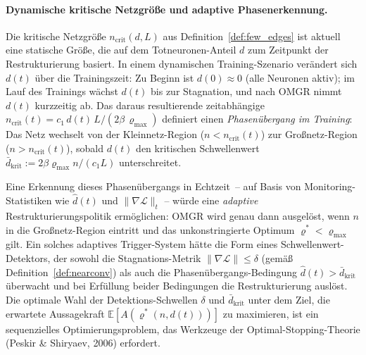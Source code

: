 ﻿\documentclass[12pt, a4paper, openany]{report}
\newcommand{\E}{\mathbb{E}}
\newcommand{\calL}{\mathcal{L}}
\begin{document}
\paragraph{Dynamische kritische Netzgröße und adaptive Phasenerkennung.}
Die kritische Netzgröße $n_{\mathrm{crit}}(d, L)$ aus
Definition~\ref{def:few_edges} ist aktuell eine statische Größe, die auf
dem Totneuronen-Anteil $d$ zum Zeitpunkt der Restrukturierung basiert.  In
einem dynamischen Training-Szenario verändert sich $d(t)$ über die
Trainingszeit: Zu Beginn ist $d(0) \approx 0$ (alle Neuronen aktiv); im Lauf
des Trainings wächst $d(t)$ bis zur Stagnation, und nach OMGR nimmt $d(t)$
kurzzeitig ab.  Das daraus resultierende zeitabhängige
$n_{\mathrm{crit}}(t) = c_1\,d(t)\,L / (2\beta\,\varrho_{\max})$
definiert einen \emph{Phasenübergang im Training}: Das Netz wechselt von
der Kleinnetz-Region ($n < n_{\mathrm{crit}}(t)$) zur Großnetz-Region
($n > n_{\mathrm{crit}}(t)$), sobald $d(t)$ den kritischen Schwellenwert
$\bar{d}_{\mathrm{krit}} := 2\beta\varrho_{\max} n / (c_1 L)$ unterschreitet.

Eine Erkennung dieses Phasenübergangs in Echtzeit~-- auf Basis von
Monitoring-Statistiken wie $\hat{d}(t)$ und $\|\nabla\calL\|_{t}$ -- würde
eine \emph{adaptive} Restrukturierungspolitik ermöglichen: OMGR wird genau
dann ausgelöst, wenn $n$ in die Großnetz-Region eintritt und das
unkonstringierte Optimum $\varrho^* < \varrho_{\max}$ gilt.  Ein solches
adaptives Trigger-System hätte die Form eines Schwellenwert-Detektors, der
sowohl die Stagnations-Metrik $\|\nabla\calL\| \leq \delta$ (gemäß
Definition~\ref{def:nearconv}) als auch die Phasenübergangs-Bedingung
$\hat{d}(t) > \bar{d}_{\mathrm{krit}}$ überwacht und bei Erfüllung beider
Bedingungen die Restrukturierung auslöst.  Die optimale Wahl der
Detektions-Schwellen $\delta$ und $\bar{d}_{\mathrm{krit}}$ unter dem
Ziel, die erwartete Aussagekraft $\E[A(\varrho^*(n, d(t)))]$ zu maximieren,
ist ein sequenzielles Optimierungsproblem, das Werkzeuge der
Optimal-Stopping-Theorie (Peskir \& Shiryaev, 2006) erfordert.
\end{document}
